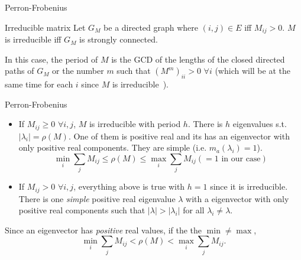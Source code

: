 \documentclass[10pt]{beamer}
\begin{document}
\begin{frame}[allowframebreaks]{Perron-Frobenius}
  \begin{block}{Irreducible matrix}
    Let $G_M$ be a directed graph where $(i,j) \in E$ iff $M_{ij} > 0$.
    $M$ is irreducible iff $G_M$ is strongly connected.

    In this case, the period of $M$ is the GCD of the lengths of the closed directed paths
    of $G_M$ or the number $m$ such that $(M^m)_{ii} > 0$ $\forall i$
    (which will be at the same time for each $i$ since $M$ is irreducible~\cite{kitchens1998symbolic}).
  \end{block}
  \begin{block}{Perron-Frobenius}
    \begin{itemize}
      \item If $M_{ij} \geq 0$ $\forall i,j$, $M$ is irreducible with period $h$.
        There is $h$ eigenvalues s.t. $|\lambda_i| = \rho(M)$.
        One of them is positive real and its has an eigenvector with only positive real components.
        They are simple (i.e. $m_a(\lambda_i) = 1$).
        \[ \min_i \sum_j M_{ij} \leq \rho(M) \leq \max_i \sum_j M_{ij} (= 1 \text{ in our case}) \]
      \item If $M_{ij} > 0$ $\forall i,j$, everything above is true with $h=1$ since it is irreducible.
        There is one \emph{simple} positive real eigenvalue $\lambda$ with a eigenvector with only positive real components
        such that $|\lambda| > |\lambda_i|$ for all $\lambda_i \neq \lambda$.
    \end{itemize}
    Since an eigenvector has \emph{positive} real values, if the the $\min \neq \max$,
    \[ \min_i \sum_j M_{ij} < \rho(M) < \max_i \sum_j M_{ij}. \]
  \end{block}
\end{frame}
\end{document}

